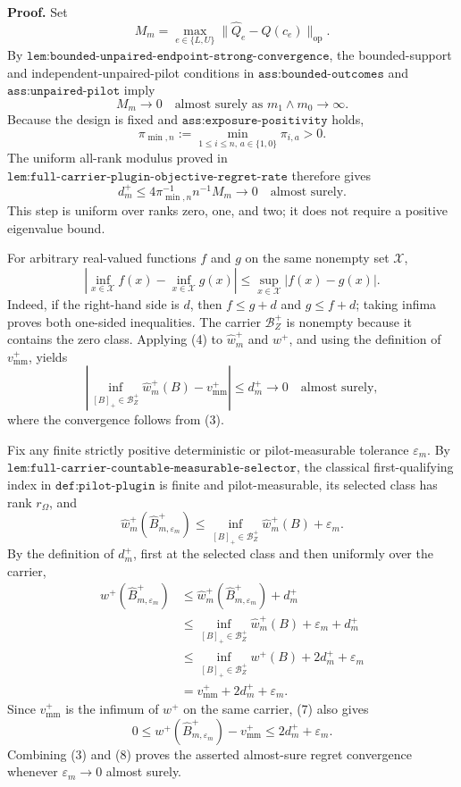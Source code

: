 \textbf{Proof.}
Set
\[
M_m=\max_{e\in\{L,U\}}
\lVert\widehat Q_e-Q(c_e)\rVert_{\mathrm{op}}.
\]
By \(\texttt{lem:bounded-unpaired-endpoint-strong-convergence}\), the bounded-support and independent-unpaired-pilot conditions in \(\texttt{ass:bounded-outcomes}\) and \(\texttt{ass:unpaired-pilot}\) imply
\[
M_m\longrightarrow0
\quad\text{almost surely as }m_1\wedge m_0\to\infty.
\tag{1}
\]
Because the design is fixed and \(\texttt{ass:exposure-positivity}\) holds,
\[
\pi_{\min,n}:=\min_{1\le i\le n,\,a\in\{1,0\}}\pi_{i,a}>0.
\tag{2}
\]
The uniform all-rank modulus proved in \(\texttt{lem:full-carrier-plugin-objective-regret-rate}\) therefore gives
\[
d_m^+
\le 4\pi_{\min,n}^{-1}n^{-1}M_m
\longrightarrow0
\quad\text{almost surely}.
\tag{3}
\]
This step is uniform over ranks zero, one, and two; it does not require a positive eigenvalue bound.

For arbitrary real-valued functions \(f\) and \(g\) on the same nonempty set \(\mathcal X\),
\[
\left|\inf_{x\in\mathcal X}f(x)-\inf_{x\in\mathcal X}g(x)\right|
\le \sup_{x\in\mathcal X}|f(x)-g(x)|.
\tag{4}
\]
Indeed, if the right-hand side is \(d\), then \(f\le g+d\) and \(g\le f+d\); taking infima proves both one-sided inequalities.  The carrier \(\mathcal B_Z^+\) is nonempty because it contains the zero class.  Applying (4) to \(\widehat w_m^+\) and \(w^+\), and using the definition of \(v_{\mathrm{mm}}^+\), yields
\[
\left|
\inf_{[B]_+\in\mathcal B_Z^+}\widehat w_m^+(B)
-v_{\mathrm{mm}}^+
\right|
\le d_m^+\longrightarrow0
\quad\text{almost surely},
\tag{5}
\]
where the convergence follows from (3).

Fix any finite strictly positive deterministic or pilot-measurable tolerance \(\varepsilon_m\).  By \(\texttt{lem:full-carrier-countable-measurable-selector}\), the classical first-qualifying index in \(\texttt{def:pilot-plugin}\) is finite and pilot-measurable, its selected class has rank \(r_\Omega\), and
\[
\widehat w_m^+(\widehat B_{m,\varepsilon_m}^+)
\le
\inf_{[B]_+\in\mathcal B_Z^+}\widehat w_m^+(B)+\varepsilon_m.
\tag{6}
\]
By the definition of \(d_m^+\), first at the selected class and then uniformly over the carrier,
\[
\begin{aligned}
w^+(\widehat B_{m,\varepsilon_m}^+)
&\le \widehat w_m^+(\widehat B_{m,\varepsilon_m}^+)+d_m^+\\
&\le \inf_{[B]_+\in\mathcal B_Z^+}\widehat w_m^+(B)
+\varepsilon_m+d_m^+\\
&\le \inf_{[B]_+\in\mathcal B_Z^+}w^+(B)
+2d_m^++\varepsilon_m\\
&=v_{\mathrm{mm}}^++2d_m^++\varepsilon_m.
\end{aligned}
\tag{7}
\]
Since \(v_{\mathrm{mm}}^+\) is the infimum of \(w^+\) on the same carrier, (7) also gives
\[
0\le
w^+(\widehat B_{m,\varepsilon_m}^+)-v_{\mathrm{mm}}^+
\le 2d_m^++\varepsilon_m.
\tag{8}
\]
Combining (3) and (8) proves the asserted almost-sure regret convergence whenever \(\varepsilon_m\to0\) almost surely.

